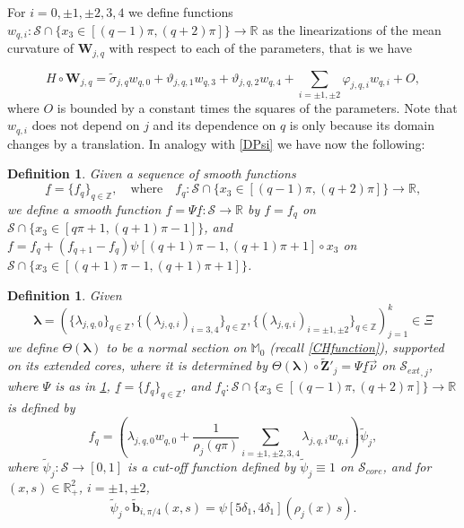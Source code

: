 \documentclass[12pt,namelimits,sumlimits]{amsart}
\newtheorem{definition}[theorem]{Definition}
\theoremstyle{remark}
\numberwithin{equation}{section}
\begin{document}
For $i=0,\pm1,\pm2,3,4$ we define functions $w_{q,i} : {{\mathcal{S}}}\cap\{x_3\in[(q-1)\pi,(q+2)\pi]\} \to{\mathbb{R}}$ 
as the linearizations of the mean curvature of ${\boldsymbol{W}}_{j,q}$ with respect to each of the parameters,
that is we have
\addtocounter{theorem}{1}
\begin{equation}
\label{Ewjq}
H\circ{\boldsymbol{W}}_{j,q}
=
\widetilde{\sigma}_{j,q}w_{q,0}
+\vartheta_{j,q,1}w_{q,3}
+\vartheta_{j,q,2}w_{q,4}
+\sum_{{i=\pm1,\pm2}} \varphi_{j,q,i} w_{q,i}
+O,
\end{equation}
where $O$ is bounded by a constant times the squares of the parameters.
Note that $w_{q,i}$ does not depend on $j$ and its dependence on $q$ is only because 
its domain changes by a translation.
In analogy with \ref{DPsi} we have now the following:

\addtocounter{equation}{1}
\begin{definition}
\label{DPsif}
Given a sequence of smooth functions
$$
\underline{f}=\{f_q\}_{q\in{\mathbb{Z}}},
\quad\text{where}\quad
f_q:{{\mathcal{S}}}\cap\{x_3\in[(q-1)\pi,(q+2)\pi]\} \to{\mathbb{R}},
$$
we define a smooth function $f=\Psi\underline{f}:{{\mathcal{S}}} \to {\mathbb{R}}$ by
$f=f_q$ on ${{\mathcal{S}}}\cap\{x_3\in[q\pi+1,(q+1)\pi-1]\}$,
and
$f=f_q+(f_{q+1}-f_q)\psi[(q+1)\pi-1,(q+1)\pi+1]\circ x_3$ on
${{\mathcal{S}}}\cap\{x_3\in[(q+1)\pi-1,(q+1)\pi+1]\}$.
\end{definition}

\addtocounter{equation}{1}
\begin{definition}
\label{DTheta}
Given 
$$
{\boldsymbol{\lambda}}=
\left(
\{\lambda_{{{j,q}},0}\}_{q\in{\mathbb{Z}}},
\{(\lambda_{{{j,q}},i})_{i=3,4}\}_{q\in{\mathbb{Z}}},
\{(\lambda_{{{j,q}},i})_{{i=\pm1,\pm2}}\}_{q\in{\mathbb{Z}}}
\right)_{j=1}^k
\in\Xi
$$
we define $\Theta({\boldsymbol{\lambda}})$ to be  a normal section on ${\mathbb{M}}_0$ (recall \ref{CHfunction}),
supported on its extended cores,
where it is determined by
$\Theta({\boldsymbol{\lambda}}) \circ {\widetilde{\boldsymbol{Z}}}'_j =\Psi\underline{f} {\vec{\nu}}$
on ${{\mathcal{S}_{ext}}}_{,j}$, where $\Psi$ is as in \ref{DPsif},
$\underline{f}=\{f_q\}_{q\in{\mathbb{Z}}}$,
and
$f_q:{{\mathcal{S}}}\cap\{x_3\in[(q-1)\pi,(q+2)\pi]\} \to{\mathbb{R}}$
is defined by 
$$
f_q=
\left(
\lambda_{{{j,q}},0}w_{q,0}
+
\frac1 {\rho_j(q\pi)}
\sum_{{{i=\pm1,\pm2}},3,4} \lambda_{j,q,i} w_{q,i}
\right)
{\widetilde{\psi}_j},
$$
where
$\widetilde{\psi}_j:{{\mathcal{S}}}\to[0,1]$ is a cut-off function defined by
$\widetilde{\psi}_j\equiv1$
on 
${{\mathcal{S}_{core}}}$,
and for 
$(x,s)\in{{{\mathbb{R}}^2_+}}$,
${{i=\pm1,\pm2}}$,
$$
\widetilde{\psi}_j \circ  {\widetilde{\boldsymbol{b}}}_{i,\pi/4} (x,s)=
\psi[5\delta_1,4\delta_1](\rho_j(x)\, s).
$$
\end{definition}
\end{document}
